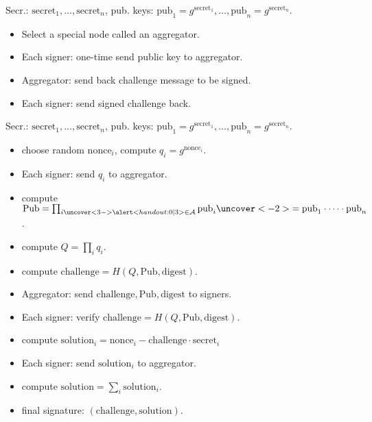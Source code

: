 \begin{frame}
Secr.: $\mathrm{secret}_1, \dots, \mathrm{secret}_n$, pub. keys: $\mathrm{pub}_1 = g^{ \mathrm{secret }_1 }, \dots, \mathrm{pub}_n= g^{\mathrm{secret}_n}$.
\begin{emptyTheorem}
\begin{itemize}
\item Select a special node called an aggregator.
\item Each signer: one-time send public key to aggregator.
\item Aggregator: send back challenge message to be signed.
\item Each signer: send signed challenge back.
\end{itemize}
\end{emptyTheorem}

\vskip 15cm

\end{frame}

\begin{frame}
Secr.: $\mathrm{secret}_1, \dots, \mathrm{secret}_n$, pub. keys: $\mathrm{pub}_1 = g^{ \mathrm{secret }_1 }, \dots, \mathrm{pub}_n= g^{\mathrm{secret}_n}$.

\begin{emptyTheorem}
\begin{itemize}
\item {} choose random $\mathrm{nonce}_i$, compute $q_i = g^{\mathrm{nonce}_i}$.
\item<2-> Each signer: send $q_i$ to aggregator.  
\item {} compute $ \mathrm{Pub} =\prod_{i \uncover<3->{ \alertNoH{3}{\in \mathcal A} }} \mathrm{pub}_i \uncover<-2>{=\mathrm{pub}_1\cdot \dots \cdot \mathrm{pub}_n}$. \item {} compute $ Q = \prod_i q_i$.
\item {} compute  $\mathrm{challenge} = H(Q, \mathrm{Pub}, \mathrm{digest})$.
\item<2-> Aggregator: send $\mathrm{challenge},\mathrm{Pub}, \mathrm{digest}$ to signers.
\item<2-> Each signer: verify $\mathrm{challenge} = H(Q, \mathrm {Pub}, \mathrm{digest}) $.
\item {} compute $\mathrm{solution}_i = {\mathrm{nonce}_i - \mathrm{challenge} \cdot \mathrm{secret}_i} $
\item<2-> Each signer: send $\mathrm{solution}_i$ to aggregator.
\item {} compute $\mathrm{solution} = \sum_i \mathrm{solution}_i $.
\item {} final signature: $(\mathrm{challenge}, \mathrm{solution})$.
\end{itemize}
\end{emptyTheorem}

\vskip 15cm
\end{frame}

